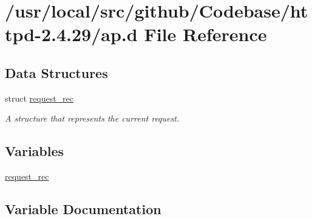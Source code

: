 \hypertarget{ap_8d}{}\section{/usr/local/src/github/\+Codebase/httpd-\/2.4.29/ap.d File Reference}
\label{ap_8d}
\subsection*{Data Structures}
\begin{DoxyCompactItemize}
\item 
struct \hyperlink{structrequest__rec}{request\+\_\+rec}
\begin{DoxyCompactList}\small\item\em A structure that represents the current request. \end{DoxyCompactList}\end{DoxyCompactItemize}
\subsection*{Variables}
\begin{DoxyCompactItemize}
\item 
\hyperlink{ap_8d_ae94d05351d94ebae70fa009190a208e0}{request\+\_\+rec}
\end{DoxyCompactItemize}


\subsection{Variable Documentation}
\subsubsection[{\texorpdfstring{request\+\_\+rec}{request_rec}}]{}\hypertarget{ap_8d_ae94d05351d94ebae70fa009190a208e0}{}\label{ap_8d_ae94d05351d94ebae70fa009190a208e0}
